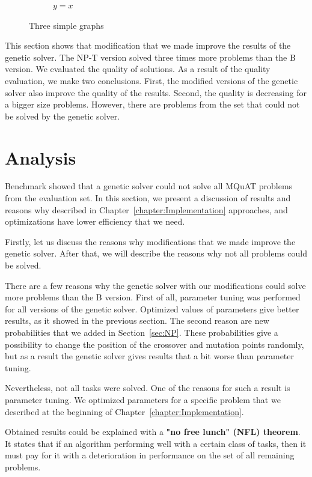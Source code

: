 \begin{figure}
\begin{subfigure}{0.45\textwidth}
		\caption{$y=x$}
		\label{fig:MediumProblemEnergy}
	\end{subfigure}    
	\caption{Three simple graphs}
	\label{fig:SmallMediumProblemEnergy}    
\end{figure}


This section shows that modification that we made improve the results of the genetic solver. The NP-T version solved three times more problems than the B version. We evaluated the quality of solutions. As a result of the quality evaluation, we make two conclusions. First, the modified versions of the genetic solver also improve the quality of the results. Second, the quality is decreasing for a bigger size problems.
However, there are problems from the set that could not be solved by the genetic solver.


\section{Analysis}

Benchmark showed that a genetic solver could not solve all MQuAT problems from the evaluation set.
In this section, we present a discussion of results and reasons why described in Chapter~\ref{chapter:Implementation} approaches, and optimizations have lower efficiency that we need.

Firstly, let us discuss the reasons why modifications that we made improve the genetic solver. After that, we will describe the reasons why not all problems could be solved.

There are a few reasons why the genetic solver with our modifications could solve more problems than the B version. First of all, parameter tuning was performed for all versions of the genetic solver. Optimized values of parameters give better results, as it showed in the previous section. The second reason are new probabilities that we added in Section~\ref{sec:NP}. These probabilities give a possibility to change the position of the crossover and mutation points randomly, but as a result the genetic solver gives results that a bit worse than parameter tuning. 

Nevertheless, not all tasks were solved. One of the reasons for such a result is parameter tuning. We optimized parameters for a specific problem that we described at the beginning of Chapter~\ref{chapter:Implementation}.

Obtained results could be explained with a \textbf{"no free lunch" (NFL) theorem}\cite{wolpert1996, wolpert1997}. It states that if an algorithm performing well with a certain class of tasks, then it must pay for it with a deterioration in performance on the set of all remaining problems.

